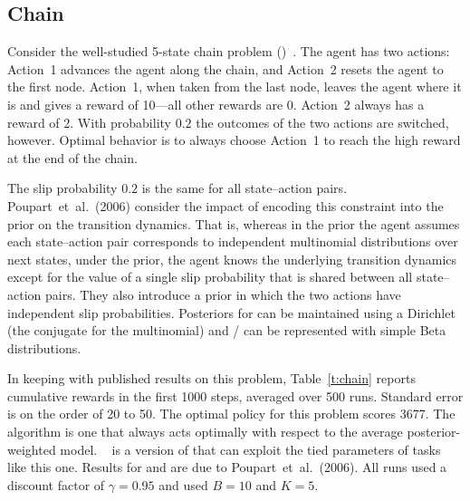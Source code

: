 \subsection{Chain}


Consider the well-studied 5-state chain
problem ()~\cite{strens00,poupart06}.  The agent has two
actions: Action~1 advances the agent along the chain, and Action~2
resets the agent to the first node.  Action~1, when taken from the
last node, leaves the agent where it is and gives a reward of 10---all
other rewards are 0.  Action~2 always has a reward of 2.  With
probability $0.2$ the outcomes of the two actions are switched, however.  Optimal
behavior is to always choose Action~1 to reach the high reward at the end
of the chain.


The slip probability $0.2$ is the same for all state--action pairs.
Poupart~et~al.~(2006) consider the impact of encoding this constraint
into the prior on the transition dynamics.  That is, whereas in the
 prior the agent assumes each state--action pair corresponds
to independent multinomial distributions over next states, under the
 prior, the agent knows the underlying transition dynamics
except for the value of a single slip probability that is shared
between all state--action pairs.  They also introduce a  prior
in which the two actions have independent slip probabilities.
Posteriors for  can be maintained using a Dirichlet (the conjugate
for the multinomial) and / can be represented with simple
Beta distributions.

In keeping with published results on this problem, Table~\ref{t:chain}
reports cumulative rewards in the first 1000 steps, averaged over 500
runs.  Standard error is on the order of 20 to 50.  The optimal policy
for this problem scores 3677.  The  algorithm is one that
always acts optimally with respect to the average posterior-weighted model.  ~\cite{leffler07} is a version of  that
can exploit the tied parameters of tasks like this one.  Results for
 and  are due to Poupart~et~al.~(2006).  All runs used a
discount factor of $\gamma=0.95$ and  used $B=10$ and $K=5$.


